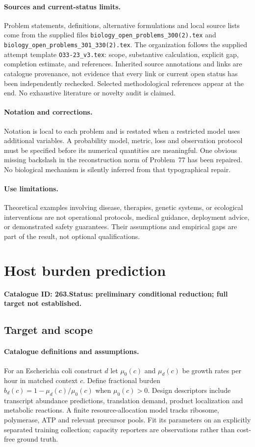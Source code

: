 \documentclass[11pt]{article}
\begin{document}
\paragraph{Sources and current-status limits.}
Problem statements, definitions, alternative formulations and local source lists
come from the supplied files
\texttt{biology\_open\_problems\_300(2).tex} and
\texttt{biology\_open\_problems\_301\_330(2).tex}.
The organization follows the supplied attempt template
\texttt{O33-23\_v3.tex}: scope, substantive calculation, explicit gap,
completion estimate, and references. Inherited source annotations and links are
catalogue provenance, not evidence that every link or current open status has
been independently rechecked. Selected methodological references appear at the
end. No exhaustive literature or novelty audit is claimed.

\paragraph{Notation and corrections.}
Notation is local to each problem and is restated when a restricted model uses
additional variables. A probability model, metric, loss and observation protocol
must be specified before its numerical quantities are meaningful. One obvious
missing backslash in the reconstruction norm of Problem~77 has been repaired.
No biological mechanism is silently inferred from that typographical repair.

\paragraph{Use limitations.}
Theoretical examples involving disease, therapies, genetic systems, or ecological
interventions are not operational protocols, medical guidance, deployment advice,
or demonstrated safety guarantees. Their assumptions and empirical gaps are part
of the result, not optional qualifications.

\setcounter{section}{262}
\section{Host burden prediction}
\label{prob:263}
\noindent\textbf{Catalogue ID: 263.}\quad \textbf{Status: preliminary conditional reduction; full target not established.}
\subsection{Target and scope}
\paragraph{Catalogue definitions and assumptions.}
For an Escherichia coli construct $d$ let $\mu_0(c)$ and $\mu_d(c)$ be growth rates per hour in matched context $c$. Define fractional burden $b_d(c)=1-\mu_d(c)/\mu_0(c)$ when $\mu_0(c)>0$. Design descriptors include transcript abundance predictions, translation demand, product localization and metabolic reactions. A finite resource-allocation model tracks ribosome, polymerase, ATP and relevant precursor pools. Fit its parameters on an explicitly separated training collection; capacity reporters are observations rather than cost-free ground truth.
\end{document}
